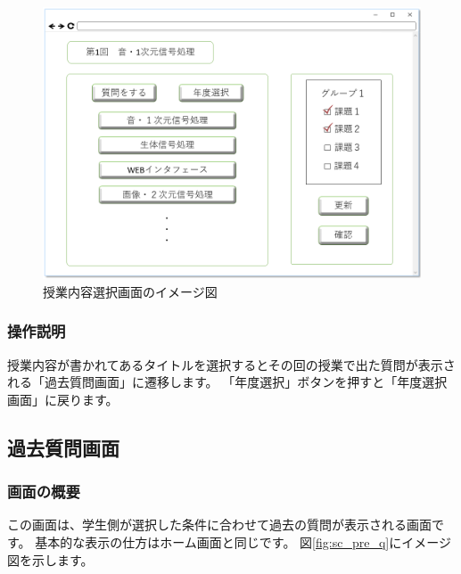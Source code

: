\begin{figure}[htbp]
\begin{center}
  \includegraphics[width=1\linewidth,clip]{./img/sc_class_content.png}
  \caption{授業内容選択画面のイメージ図}\label{fig:sc_class_content}
\end{center}
\end{figure}

\subsubsection{操作説明}
授業内容が書かれてあるタイトルを選択するとその回の授業で出た質問が表示される「過去質問画面」に遷移します。
「年度選択」ボタンを押すと「年度選択画面」に戻ります。

\subsection{過去質問画面}
\subsubsection{画面の概要}
この画面は、学生側が選択した条件に合わせて過去の質問が表示される画面です。
基本的な表示の仕方はホーム画面と同じです。
図\ref{fig:sc_pre_q}にイメージ図を示します。

